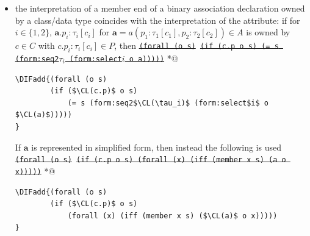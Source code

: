 \documentclass[10pt,fleqn,final]{scrreprt}
\newcommand*{\CL}{\ensuremath{\mathsf{CL}}\xspace}
\newenvironment{definitions}[0]{\medskip }{}
\newcommand{\white}[1]{{\color{white}{#1}}}
\newcommand{\qqquad}{\white{x}\qquad}
\providecommand{\DIFadd}[1]{{\protect\color{blue}\uwave{#1}}} %
\providecommand{\DIFdel}[1]{{\protect\color{red}\sout{#1}}}                      %
\providecommand{\DIFaddbegin}{} %
\providecommand{\DIFaddend}{} %
\providecommand{\DIFdelbegin}{} %
\providecommand{\DIFdelend}{} %
\begin{document}
\begin{definitions}
\begin{itemize}[topsep=0pt, label=--, leftmargin=*]
In case that all the $\tau_i$ are omitted (or, equivalently, equal to 
$\mathsf{Set}$), the representation is simplified to an \DIFdelbegin \DIFdel{$n$}\DIFdelend \DIFaddbegin \DIFadd{$r$}\DIFaddend -ary predicate:
\DIFdelbegin %
\texttt{\DIFdel{(forall ($x_1$ $x_2$ $\cdots$  $x_n$) (if (a $x_1$ $x_2$ $\cdots$  $x_n$) (and ($c_1$ $x_1$) $\cdots$ ($c_n$ $x_n$))))}}
\DIFdelend %
 *@ \DIFaddbegin \begin{lstlisting}[language=clif, mathescape]
\DIFadd{(forall (x$_1$ x$_2$ $\cdots$ x$_r$)
        (if ($\CL(a)$ x$_1$ x$_2$ $\cdots$ x$_r$) (and ($\CL(c_1)$ x$_1$) $\cdots$ ($\CL(c_r)$ $x_r$))))
}\end{lstlisting}
  \DIFaddend \item the interpretation of a member end of a binary association
declaration owned by a class/data type coincides with the interpretation
of the attribute: if for $i\in\{1,2\}$,
$\mathbf{a}.p_i : \tau_i[c_i]$
for $\mathbf{a} = a(p_1 : \tau_1[c_1], p_2 : \tau_2[c_2]) \in A$
is owned by $c \in C$ with $c.p_i : \tau_i[c_i] \in P$, then
\DIFdelbegin %
\texttt{\DIFdel{(forall (o s)}%
\DIFdel{(if (c.p o s) (= s (form:seq2$\tau_i$ (form:select$i$ o a)))))}}%
\DIFdelend %
 *@ \DIFaddbegin \begin{lstlisting}[language=clif, mathescape]
\DIFadd{(forall (o s)
        (if ($\CL(c.p)$ o s)
            (= s (form:seq2$\CL(\tau_i)$ (form:select$i$ o $\CL(a)$)))))
}\end{lstlisting}
\DIFaddend If $\mathbf{a}$ is represented in simplified form, then instead the
following is used
\DIFdelbegin %
\texttt{\DIFdel{(forall (o s)}%
\DIFdel{(if (c.p o s) (forall (x) (iff (member x s) (a o x)))))}}
\DIFdelend %
 *@ \DIFaddbegin \begin{lstlisting}[language=clif, mathescape]
\DIFadd{(forall (o s)
        (if ($\CL(c.p)$ o s)
            (forall (x) (iff (member x s) ($\CL(a)$ o x)))))
}\end{lstlisting}


\end{itemize}
\end{definitions}
\end{document}
